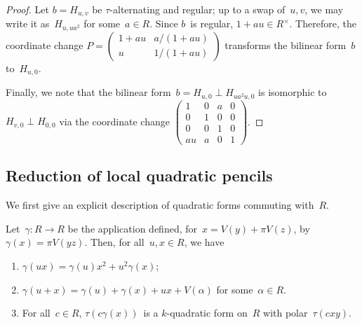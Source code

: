 \documentclass{lms}
\def\mat#1{\begin{pmatrix}#1\end{pmatrix}}
\begin{document}
\begin{proof}
Let $b = H_{u,v}$ be $τ$-alternating and regular; up to a swap of~$u, v$, we
may write it as~$H_{u, u a^2}$ for some~$a ∈ R$. Since $b$~is
regular, $1 + a u ∈ R^{×}$. Therefore, the coordinate
change $P = \mat{1+a u & a/(1+a u) \\ u & 1/(1+a u)}$ transforms the
bilinear form~$b$ to~$H_{u, 0}$.

Finally, we note that the bilinear form~$b = H_{u, 0} ⟂ H_{u a^2 u, 0}$ is
isomorphic to~$H_{v, 0} ⟂ H_{0,0}$ via the coordinate change
$\mat{1 & 0 & a & 0\\0&1&0&0\\0&0&1&0\\au & a & 0 & 1}$.
\end{proof}

\subsection{Reduction of local quadratic pencils}

We first give an explicit description of quadratic forms commuting
with~$R$.

\begin{lem}\label{lem:gamma-polar}
Let~$γ: R → R$ be the application defined, for~$x = V(y) + π V(z)$,
by~$γ(x) = π V(yz)$. Then, for all~$u, x ∈ R$, we have
\begin{enumerate}
\item $γ(ux) = γ(u) x^2 + u^2 γ(x)$;
\item $γ(u+x) = γ(u) + γ(x) + ux + V(α)$ for some~$α ∈ R$.
\item For all~$c ∈ R$, $τ(c γ (x))$~is a $k$-quadratic form on~$R$
with polar~$τ(c x y)$.
\end{enumerate}
\end{lem}
\end{document}
